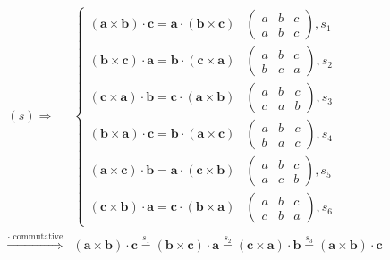 \documentclass[
]{book}
\theoremstyle{definition}
\theoremstyle{definition}
\theoremstyle{definition}
\theoremstyle{definition}
\theoremstyle{remark}
\begin{document}
\[
\begin{aligned}
\left(s\right)\Rightarrow & \begin{cases}
\left(\boldsymbol{a}\times\boldsymbol{b}\right)\cdot\boldsymbol{c}=\boldsymbol{a}\cdot\left(\boldsymbol{b}\times\boldsymbol{c}\right) & \begin{pmatrix}a & b & c\\
a & b & c
\end{pmatrix},s_{{\scriptscriptstyle 1}}\\
\left(\boldsymbol{b}\times\boldsymbol{c}\right)\cdot\boldsymbol{a}=\boldsymbol{b}\cdot\left(\boldsymbol{c}\times\boldsymbol{a}\right) & \begin{pmatrix}a & b & c\\
b & c & a
\end{pmatrix},s_{{\scriptscriptstyle 2}}\\
\left(\boldsymbol{c}\times\boldsymbol{a}\right)\cdot\boldsymbol{b}=\boldsymbol{c}\cdot\left(\boldsymbol{a}\times\boldsymbol{b}\right) & \begin{pmatrix}a & b & c\\
c & a & b
\end{pmatrix},s_{{\scriptscriptstyle 3}}\\
\left(\boldsymbol{b}\times\boldsymbol{a}\right)\cdot\boldsymbol{c}=\boldsymbol{b}\cdot\left(\boldsymbol{a}\times\boldsymbol{c}\right) & \begin{pmatrix}a & b & c\\
b & a & c
\end{pmatrix},s_{{\scriptscriptstyle 4}}\\
\left(\boldsymbol{a}\times\boldsymbol{c}\right)\cdot\boldsymbol{b}=\boldsymbol{a}\cdot\left(\boldsymbol{c}\times\boldsymbol{b}\right) & \begin{pmatrix}a & b & c\\
a & c & b
\end{pmatrix},s_{{\scriptscriptstyle 5}}\\
\left(\boldsymbol{c}\times\boldsymbol{b}\right)\cdot\boldsymbol{a}=\boldsymbol{c}\cdot\left(\boldsymbol{b}\times\boldsymbol{a}\right) & \begin{pmatrix}a & b & c\\
c & b & a
\end{pmatrix},s_{{\scriptscriptstyle 6}}
\end{cases}\\
\overset{\cdot\text{ commutative}}{\Rightarrow} & \left(\boldsymbol{a}\times\boldsymbol{b}\right)\cdot\boldsymbol{c}\overset{s_{{\scriptscriptstyle 1}}}{=}\left(\boldsymbol{b}\times\boldsymbol{c}\right)\cdot\boldsymbol{a}\overset{s_{{\scriptscriptstyle 2}}}{=}\left(\boldsymbol{c}\times\boldsymbol{a}\right)\cdot\boldsymbol{b}\overset{s_{{\scriptscriptstyle 3}}}{=}\left(\boldsymbol{a}\times\boldsymbol{b}\right)\cdot\boldsymbol{c}\\

\end{aligned}\]
\end{document}
